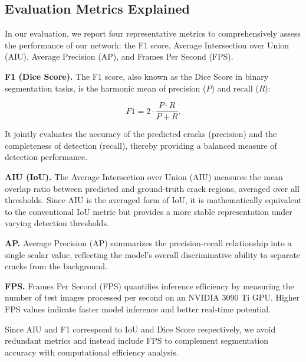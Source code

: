 \documentclass[journal]{IEEEtran}
\begin{document}
\subsection{Evaluation Metrics Explained}


In our evaluation, we report four representative metrics to comprehensively assess the performance of our network: 
the F1 score, Average Intersection over Union (AIU), Average Precision (AP), and Frames Per Second (FPS).



\textbf{F1 (Dice Score).} 
The F1 score, also known as the Dice Score in binary segmentation tasks, is the harmonic mean of precision ($P$) and recall ($R$):


\begin{equation}
F1 = 2 \cdot \frac{P \cdot R}{P + R}.
\end{equation}



It jointly evaluates the accuracy of the predicted cracks (precision) and the completeness of detection (recall), 
thereby providing a balanced measure of detection performance.



\textbf{AIU (IoU).}
The Average Intersection over Union (AIU) measures the mean overlap ratio between predicted and ground-truth crack regions, averaged over all thresholds.
Since AIU is the averaged form of IoU, it is mathematically equivalent to the conventional IoU metric 
but provides a more stable representation under varying detection thresholds.



\textbf{AP.}
Average Precision (AP) summarizes the precision-recall relationship into a single scalar value, 
reflecting the model’s overall discriminative ability to separate cracks from the background.



\textbf{FPS.}
Frames Per Second (FPS) quantifies inference efficiency by measuring the number of test images processed per second on an NVIDIA 3090 Ti GPU. 
Higher FPS values indicate faster model inference and better real-time potential.



Since AIU and F1 correspond to IoU and Dice Score respectively, 
we avoid redundant metrics and instead include FPS to complement segmentation accuracy with computational efficiency analysis.


\end{document}
